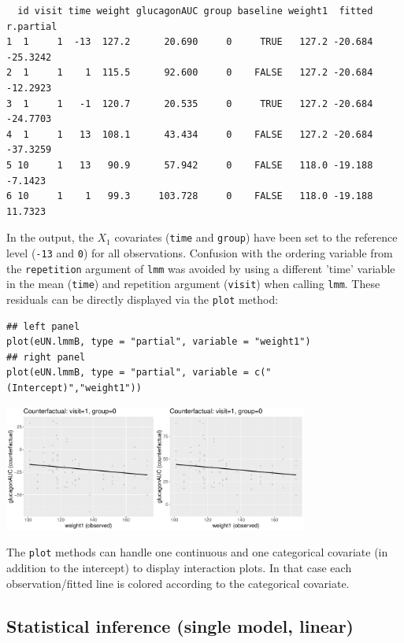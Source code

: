 \documentclass[12pt]{article}
\begin{document}
\begin{verbatim}
  id visit time weight glucagonAUC group baseline weight1  fitted r.partial
1  1     1  -13  127.2      20.690     0     TRUE   127.2 -20.684  -25.3242
2  1     1    1  115.5      92.600     0    FALSE   127.2 -20.684  -12.2923
3  1     1   -1  120.7      20.535     0     TRUE   127.2 -20.684  -24.7703
4  1     1   13  108.1      43.434     0    FALSE   127.2 -20.684  -37.3259
5 10     1   13   90.9      57.942     0    FALSE   118.0 -19.188   -7.1423
6 10     1    1   99.3     103.728     0    FALSE   118.0 -19.188   11.7323
\end{verbatim}


In the output, the \(X_1\) covariates (\texttt{time} and \texttt{group}) have been
set to the reference level (\texttt{-13} and \texttt{0}) for all
observations. Confusion with the ordering variable from the
\texttt{repetition} argument of \texttt{lmm} was avoided by using a different 'time'
variable in the mean (\texttt{time}) and repetition argument (\texttt{visit}) when
calling \texttt{lmm}.  These residuals can be directly displayed via the
\texttt{plot} method:
\lstset{language=r,label= ,caption= ,captionpos=b,numbers=none}
\begin{lstlisting}
## left panel
plot(eUN.lmmB, type = "partial", variable = "weight1")
## right panel
plot(eUN.lmmB, type = "partial", variable = c("(Intercept)","weight1"))
\end{lstlisting}

\begin{center}
\includegraphics[width=0.75\textwidth]{./figures/fit-pres.pdf}
\end{center}

The \texttt{plot} methods can handle one continuous and one categorical
covariate (in addition to the intercept) to display interaction
plots. In that case each observation/fitted line is colored according
to the categorical covariate.

\clearpage

\subsection{Statistical inference (single model, linear)}
\label{sec:org689cc34}
\end{document}
